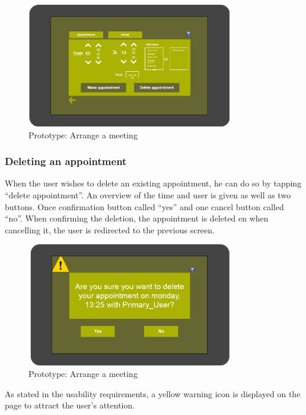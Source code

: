 \documentclass[11pt, a4paper,svglistings]{report}
\begin{document}
\begin{figure}[H]
\centering
    \includegraphics[width=0.8\textwidth]{Prototypes/MakeAppointmentPrimary.png}
  \caption{Prototype: Arrange a meeting}
\end{figure}


\subsubsection{Deleting an appointment}

When the user wishes to delete an existing appointment, he can do so by tapping ``delete appointment''. An overview of the time and user is given as well as two buttons. Once confirmation button called ``yes'' and one cancel button called ``no''. When confirming the deletion, the appointment is deleted en when cancelling it, the user is redirected to the previous screen.


\begin{figure}[H]
\centering
    \includegraphics[width=0.8\textwidth]{Prototypes/Confirmation.png}
  \caption{Prototype: Arrange a meeting}
\end{figure}
As stated in the usability requirements, a yellow warning icon is displayed on the page to attract the user's attention.
\end{document}
